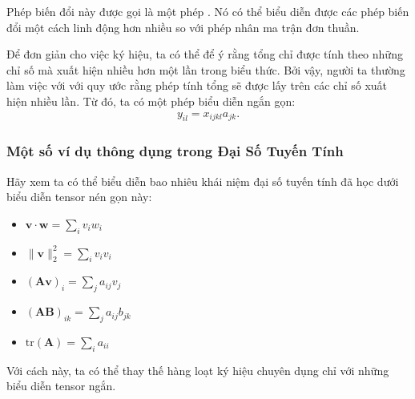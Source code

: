 \documentclass[letterpaper,11pt,english]{sphinxmanual}
\begin{document}
Phép biến đổi này được gọi là một phép . Nó có thể biểu diễn
được các phép biến đổi một cách linh động hơn nhiều so với phép nhân ma
trận đơn thuần.



Để đơn giản cho việc ký hiệu, ta có thể để ý rằng tổng chỉ được tính
theo những chỉ số mà xuất hiện nhiều hơn một lần trong biểu thức. Bởi
vậy, người ta thường làm việc với  với quy ước rằng
phép tính tổng sẽ được lấy trên các chỉ số xuất hiện nhiều lần. Từ đó,
ta có một phép biểu diễn ngắn gọn:
\begin{equation}\label{equation:chapter_appendix_math/geometry-linear-algebric-ops_vn:chapter_appendix_math/geometry-linear-algebric-ops_vn:30}
\begin{split}y_{il} = x_{ijkl}a_{jk}.\end{split}
\end{equation}







\subsubsection{Một số ví dụ thông dụng trong Đại Số Tuyến Tính}
\label{\detokenize{chapter_appendix_math/geometry-linear-algebric-ops_vn:mot-so-vi-du-thong-dung-trong-dai-so-tuyen-tinh}}


Hãy xem ta có thể biểu diễn bao nhiêu khái niệm đại số tuyến tính đã học
dưới biểu diễn tensor nén gọn này:


\begin{itemize}
\item {} 
\(\mathbf{v} \cdot \mathbf{w} = \sum_i v_iw_i\)

\item {} 
\(\|\mathbf{v}\|_2^{2} = \sum_i v_iv_i\)

\item {} 
\((\mathbf{A}\mathbf{v})_i = \sum_j a_{ij}v_j\)

\item {} 
\((\mathbf{A}\mathbf{B})_{ik} = \sum_j a_{ij}b_{jk}\)

\item {} 
\(\mathrm{tr}(\mathbf{A}) = \sum_i a_{ii}\)

\end{itemize}



Với cách này, ta có thể thay thế hàng loạt ký hiệu chuyên dụng chỉ với
những biểu diễn tensor ngắn.
\end{document}
